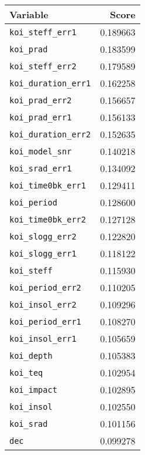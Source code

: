 \begin{tabular}{lr}
\toprule
                     Variable &     Score \\
\midrule
    \texttt{koi\_steff\_err1} &  0.189663 \\
           \texttt{koi\_prad} &  0.183599 \\
    \texttt{koi\_steff\_err2} &  0.179589 \\
 \texttt{koi\_duration\_err1} &  0.162258 \\
     \texttt{koi\_prad\_err2} &  0.156657 \\
     \texttt{koi\_prad\_err1} &  0.156133 \\
 \texttt{koi\_duration\_err2} &  0.152635 \\
     \texttt{koi\_model\_snr} &  0.140218 \\
     \texttt{koi\_srad\_err1} &  0.134092 \\
  \texttt{koi\_time0bk\_err1} &  0.129411 \\
         \texttt{koi\_period} &  0.128600 \\
  \texttt{koi\_time0bk\_err2} &  0.127128 \\
    \texttt{koi\_slogg\_err2} &  0.122820 \\
    \texttt{koi\_slogg\_err1} &  0.118122 \\
          \texttt{koi\_steff} &  0.115930 \\
   \texttt{koi\_period\_err2} &  0.110205 \\
    \texttt{koi\_insol\_err2} &  0.109296 \\
   \texttt{koi\_period\_err1} &  0.108270 \\
    \texttt{koi\_insol\_err1} &  0.105659 \\
          \texttt{koi\_depth} &  0.105383 \\
            \texttt{koi\_teq} &  0.102954 \\
         \texttt{koi\_impact} &  0.102895 \\
          \texttt{koi\_insol} &  0.102550 \\
           \texttt{koi\_srad} &  0.101156 \\
                 \texttt{dec} &  0.099278 \\
\bottomrule
\end{tabular}
